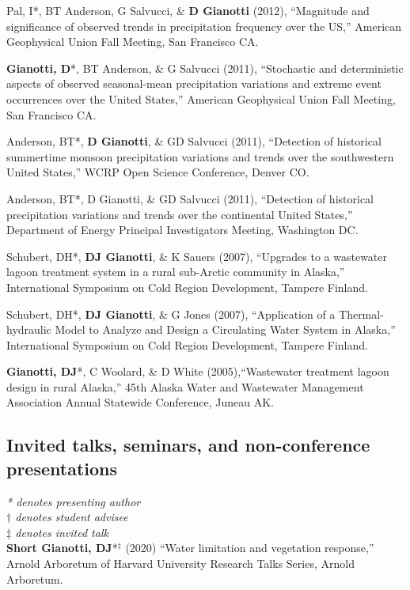 \documentclass[10pt, a4paper]{article}
\renewcommand{\emph}[1]{\textit{#1}}
\newcommand{\lbr}{\vspace*{12pt}}
\newcommand{\years}[1]{\mbox{}\marginnote{\scriptsize #1}} %
\begin{document}
\years{2012}Pal, I*, BT Anderson, G Salvucci, \& \textbf{D Gianotti} (2012), ``Magnitude and significance of observed trends in precipitation frequency over the US,'' American Geophysical Union Fall Meeting, San Francisco CA.\lbr

\years{2011}\textbf{Gianotti, D}*, BT Anderson, \& G Salvucci (2011), ``Stochastic and deterministic aspects of observed seasonal-mean precipitation variations and extreme event occurrences over the United States,'' American Geophysical Union Fall Meeting, San Francisco CA.\lbr

\years{2011}Anderson, BT*, \textbf{D Gianotti}, \& GD Salvucci (2011), ``Detection of historical summertime monsoon precipitation variations and trends over the southwestern United States,'' WCRP Open Science Conference, Denver CO.\lbr

\years{2011}Anderson, BT*, D Gianotti, \& GD Salvucci (2011), ``Detection of historical precipitation variations and trends over the continental United States,'' Department of Energy Principal Investigators Meeting, Washington DC.\lbr

\years{2007}Schubert, DH*, \textbf{DJ Gianotti}, \& K Sauers (2007), ``Upgrades to a  wastewater lagoon treatment system in a rural sub-Arctic community in Alaska,'' International Symposium on Cold Region Development, Tampere Finland.\lbr

\years{2007}Schubert, DH*, \textbf{DJ Gianotti}, \& G Jones (2007), ``Application of a Thermal-hydraulic Model to Analyze and Design a Circulating Water System in Alaska,'' International Symposium on Cold Region Development, Tampere Finland.\lbr

\years{2005}\textbf{Gianotti, DJ}*, C Woolard, \& D White (2005),``Wastewater treatment lagoon design in rural Alaska,'' 45th Alaska Water and Wastewater Management Association Annual Statewide Conference, Juneau AK.\lbr


\subsection*{Invited talks, seminars, and non-conference presentations}
\emph{* denotes presenting author}
\\ \emph{$\dagger$ denotes student advisee}
\\ \emph{$\ddag$ denotes invited talk}\\

\years{2020}\textbf{Short Gianotti, DJ}*$^\ddag$ (2020) ``Water limitation and vegetation response,'' Arnold Arboretum of Harvard University Research Talks Series, Arnold Arboretum.\lbr %
\end{document}

